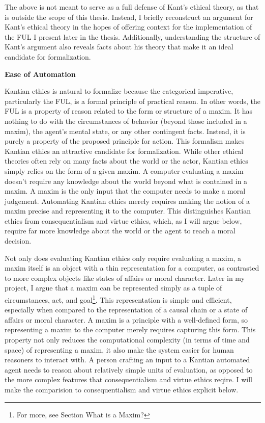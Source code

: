 \begin{isabellebody}
\begin{isamarkuptext}
The above is not meant to serve as a full defense of Kant's ethical theory, as that is outside the scope
of this thesis. Instead, I briefly reconstruct an argument for Kant's ethical theory in the hopes 
of offering context for the implementation of the FUL I present later in the thesis. Additionally, understanding 
the structure of Kant's argument also reveals facts about his theory that make it an ideal candidate 
for formalization.%
\end{isamarkuptext}\isamarkuptrue%
%
\begin{isamarkuptext}%
\textbf{Ease of Automation}%
\end{isamarkuptext}\isamarkuptrue%
%
\begin{isamarkuptext}%
Kantian ethics is natural to formalize because the categorical imperative, particularly the FUL, 
is a formal principle of practical reason. In other words, the FUL is a property of reason related 
to the form or structure of a maxim. It has nothing to do with the circumstances of behavior 
(beyond those included in a maxim), the agent's mental state, or any other contingent facts. Instead, 
it is purely a property of the proposed principle for action. This formalism makes Kantian ethics an 
attractive candidate for formalization. While other ethical theories often rely on many facts about 
the world or the actor, Kantian ethics simply relies on the form of a given maxim. A computer evaluating 
a maxim doesn't require any knowledge about the world beyond what is contained in a maxim. A maxim 
is the only input that the computer needs to make a moral judgement. Automating 
Kantian ethics merely requires making the notion of a maxim precise and representing it to the computer. 
This distinguishes Kantian ethics from consequentialism and virtue ethics, which, as I will argue below, 
require far more knowledge about the world or the agent to reach a moral decision.

Not only does evaluating Kantian ethics only require evaluating a maxim, a maxim itself is an object
with a thin representation for a computer, as contrasted to more complex objects like states of 
affairs or moral character. Later in my project, I argue that a maxim can be represented simply as 
a tuple of circumstances, act, and goal\footnote{For more, see Section What is a Maxim?}. This representation
is simple and efficient, especially when compared to the representation of a causal chain or a state of 
affairs or moral character. A maxim is a principle with a well-defined form, so representing a maxim
to the computer merely requires capturing this form. This property not only reduces the computational complexity
(in terms of time and space) of representing a maxim, it also make the system easier for human reasoners
to interact with. A person crafting an input to a Kantian automated agent needs to reason about relatively
simple units of evaluation, as opposed to the more complex features that consequentialism and virtue
ethics reqire. I will make the comparision to consequentialism and virtue ethics explicit below.


\end{isamarkuptext}
\end{isabellebody}
